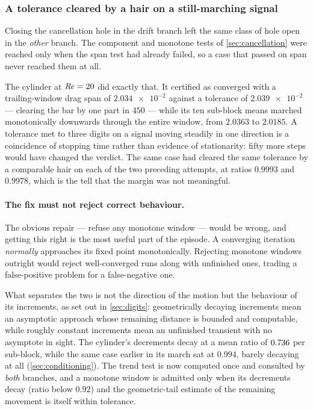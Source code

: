 \subsubsection{A tolerance cleared by a hair on a still-marching signal}
\label{sec:hairsbreadth}

Closing the cancellation hole in the drift branch left the same class of hole open in
the \emph{other} branch. The component and monotone tests of \cref{sec:cancellation}
were reached only when the span test had already failed, so a case that passed on span
never reached them at all.

The cylinder at $\mathit{Re}=20$ did exactly that. It certified as converged with a
trailing-window drag span of $\num{2.034e-2}$ against a tolerance of $\num{2.039e-2}$
--- clearing the bar by one part in $450$ --- while its ten sub-block means marched
monotonically downwards through the entire window, from $2.0363$ to $2.0185$. A
tolerance met to three digits on a signal moving steadily in one direction is a
coincidence of stopping time rather than evidence of stationarity: fifty more steps
would have changed the verdict. The same case had cleared the same tolerance by a
comparable hair on each of the two preceding attempts, at ratios $0.9993$ and
$0.9978$, which is the tell that the margin was not meaningful.

\paragraph{The fix must not reject correct behaviour.} The obvious repair --- refuse any
monotone window --- would be wrong, and getting this right is the most useful part of the
episode. A converging iteration \emph{normally} approaches its fixed point monotonically.
Rejecting monotone windows outright would reject well-converged runs along with
unfinished ones, trading a false-positive problem for a false-negative one.

What separates the two is not the direction of the motion but the behaviour of its
increments, as set out in \cref{sec:digits}: geometrically decaying increments mean an
asymptotic approach whose remaining distance is bounded and computable, while roughly
constant increments mean an unfinished transient with no asymptote in sight. The
cylinder's decrements decay at a mean ratio of $\num{0.736}$ per sub-block,
while the same case earlier in its march sat at $0.994$, barely decaying at all
(\cref{sec:conditioning}). The trend test is
now computed once and consulted by \emph{both} branches, and a monotone window is
admitted only when its decrements decay (ratio below $0.92$) and the geometric-tail
estimate of the remaining movement is itself within tolerance.

